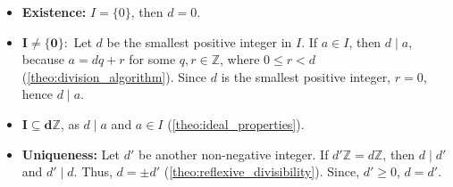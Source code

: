 \begin{Proof}
    \begin{itemize}
        \item \textbf{Existence:} $I=\{0\}$, then $d = 0$.
        \item $\mathbf{I \neq \{0\}:}$ Let $d$ be the smallest positive integer in $I$. 
        If $a\in I$, then $d\mid a$, because  $a = dq + r$ for some $q,r\in\mathbb{Z}$, where $0\leq r < d$ (\ref{theo:division_algorithm}).
        Since $d$ is the smallest positive integer, $r = 0$, hence $d\mid a$.
        \item $\mathbf{I\subseteq d\mathbb{Z}}$, as $d\mid a$ and $a\in I$ (\ref{theo:ideal_properties}).
        \item \textbf{Uniqueness:} Let $d'$ be another non-negative integer. If $d'\mathbb{Z}=d\mathbb{Z}$,
        then $d\mid d'$ and $d'\mid d$. Thus, $d=\pm d'$ (\ref{theo:reflexive_divisibility}). Since, $d'\geq0$, $d=d'$.
    \end{itemize}
    

\end{Proof}



